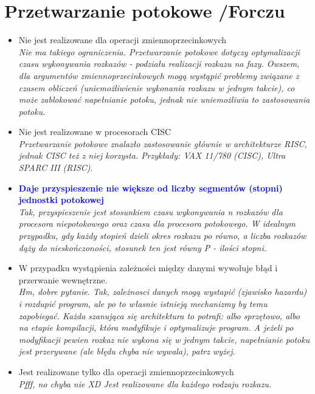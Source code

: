 \section{Przetwarzanie potokowe {\small /Forczu}}
	\begin{itemize}
    \item Nie jest realizowane dla operacji zmiennoprzecinkowych\\
    {\small \emph{Nie ma takiego ograniczenia. Przetwarzanie potokowe dotyczy optymalizacji czasu wykonywania rozkazów - podziału realizacji rozkazu na fazy. Owszem, dla argumentów zmiennoprzecinkowych mogą wystąpić problemy związane z czasem obliczeń (uniemożliwienie wykonania rozkazu w jednym takcie), co może zablokować napełnianie potoku, jednak nie uniemożliwia to zastosowania potoku.}}
    \item Nie jest realizowane w procesorach CISC\\
    {\small \emph{Przetwarzanie potokowe znalazło zastosowanie głównie w architekturze RISC, jednak CISC też z niej korzysta. Przykłady: VAX 11/780 (CISC), Ultra SPARC III (RISC)}.}
    \item \textcolor{Blue}{\textbf{Daje przyspieszenie nie większe od liczby segmentów (stopni) jednostki potokowej}}\\
    {\small \emph{Tak, przyspieszenie jest stosunkiem czasu wykonywania \emph{n} rozkazów dla procesora niepotokowego oraz czasu dla procesora potokowego. W idealnym przypadku, gdy każdy stopień dzieli okres rozkazu po równo, a liczba rozkazów dąży do nieskończoności, stosunek ten jest równy P - ilości stopni.}}
    \item W przypadku wystąpienia zależności między danymi wywołuje błąd i przerwanie wewnętrzne.\\
    {\small \emph{Hm, dobre pytanie. Tak, zależnosci danych mogą wystapić (zjawisko hazardu) i rozdupić program, ale po to własnie istnieją mechanizmy by temu zapobiegać. Każda szanująca się architektura to potrafi: albo sprzętowo, albo na etapie kompilacji, która modyfikuje i optymalizuje program. A jeżeli po modyfikacji pewien rozkaz nie wykona się w jednym takcie, napełnianie potoku jest przerywane (ale błędu chyba nie wywala), patrz wyżej.}}
    \item Jest realizowane tylko dla operacji zmiennoprzecinkowych\\
    {\small \emph{Pfff, no chyba nie XD Jest realizowane dla każdego rodzaju rozkazu.}}
    \end{itemize}

